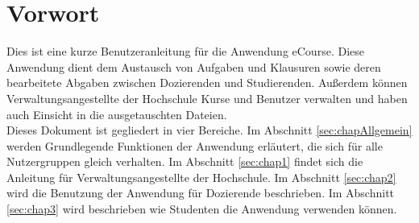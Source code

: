 
\chapter{Vorwort}
Dies ist eine kurze Benutzeranleitung für die Anwendung eCourse. Diese Anwendung dient dem Austausch von Aufgaben und Klausuren sowie deren bearbeitete Abgaben zwischen Dozierenden und Studierenden. Außerdem können Verwaltungsangestellte der Hochschule Kurse und Benutzer verwalten und haben auch Einsicht in die ausgetauschten Dateien. \\
Dieses Dokument ist gegliedert in vier Bereiche. Im Abschnitt \ref{sec:chapAllgemein} werden Grundlegende Funktionen der Anwendung erläutert, die sich für alle Nutzergruppen gleich verhalten. Im Abschnitt \ref{sec:chap1} findet sich die Anleitung für Verwaltungsangestellte der Hochschule. Im Abschnitt \ref{sec:chap2} wird die Benutzung der Anwendung für Dozierende beschrieben. Im Abschnitt \ref{sec:chap3} wird beschrieben wie Studenten die Anwendung verwenden können. 


